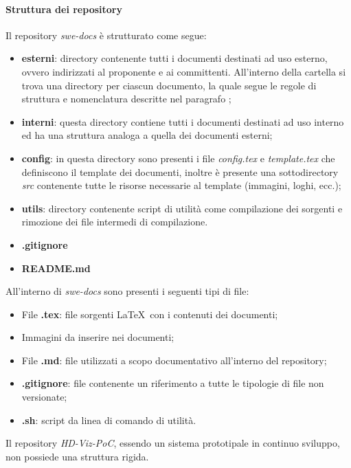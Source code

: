\paragraph{Struttura dei repository}
\label{par:struttura_repo}

Il repository \emph{swe-docs} è strutturato come segue:
\begin{itemize}
    \item \textbf{esterni}: directory contenente tutti i documenti destinati ad uso esterno, ovvero 
		indirizzati al proponente e ai committenti. All'interno della cartella si trova una directory per ciascun documento, la quale 
		segue le regole di struttura e nomenclatura descritte nel paragrafo ;
    \item \textbf{interni}: questa directory contiene tutti i documenti destinati ad uso interno ed ha una struttura analoga a quella dei 
    	documenti esterni;
    \item \textbf{config}: in questa directory sono presenti i file \emph{config.tex} e \emph{template.tex} 
    	che definiscono il template dei documenti, inoltre è presente una sottodirectory \emph{src} contenente tutte le risorse necessarie 
    	al template (immagini, loghi, ecc.);
    \item \textbf{utils}: directory contenente script di utilità come compilazione dei sorgenti e rimozione dei file intermedi di 
    	compilazione.
    \item \textbf{.gitignore}
    \item \textbf{README.md}
\end{itemize}

All'interno di \emph{swe-docs} sono presenti i seguenti tipi di file:
\begin{itemize}
    \item File \textbf{.tex}: file sorgenti \LaTeX\ con i contenuti dei documenti;
    \item Immagini da inserire nei documenti;
    \item File \textbf{.md}: file utilizzati a scopo documentativo all'interno del repository;
    \item \textbf{.gitignore}: file contenente un riferimento a tutte le tipologie di file non versionate;
    \item \textbf{.sh}: script da linea di comando di utilità.
\end{itemize}


Il repository \emph{HD-Viz-PoC}, essendo un sistema prototipale in continuo sviluppo, non possiede una struttura rigida.

